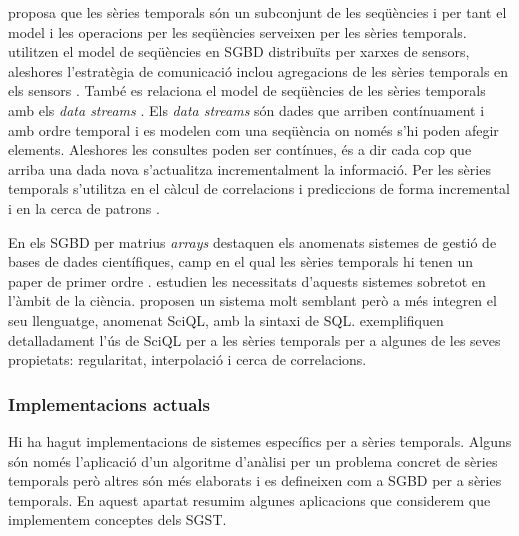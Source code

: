 \textcite{seshadri96:thesis} proposa que les sèries temporals són un subconjunt de les seqüències i per tant el model i les operacions per les seqüències \parencite{seshadri95} serveixen per les sèries temporals. 
\textcite{bonnet01} utilitzen el model de seqüències en SGBD distribuïts per xarxes de sensors, aleshores l'estratègia de comunicació inclou agregacions de les sèries temporals en els sensors \parencite{demers03}.
També es relaciona el model de seqüències de les sèries temporals amb els \emph{data streams} \parencite{babcock02,jagadish95}. Els \emph{data streams} són dades que arriben contínuament i amb ordre temporal i es modelen com una seqüència on només s'hi poden afegir elements. Aleshores les consultes poden ser contínues, és a dir cada cop que arriba una dada nova s'actualitza incrementalment la informació. Per les sèries temporals s'utilitza en el càlcul de correlacions i prediccions de forma incremental \parencite{yi00} i en la cerca de patrons \parencite{bai05}.

En els SGBD per matrius \emph{arrays} destaquen els anomenats sistemes de gestió de bases de dades científiques, camp en el qual les sèries temporals hi tenen un paper de primer ordre \parencite{zhang11}. \textcite{stonebraker09:scidb} estudien les necessitats d'aquests sistemes sobretot en l'àmbit de la ciència. \textcite{kersten11} proposen un sistema molt semblant però a més integren el seu llenguatge, anomenat SciQL, amb la sintaxi de SQL. \textcite{zhang11} exemplifiquen detalladament l'ús de SciQL per a les sèries temporals per a algunes de les seves propietats: regularitat, interpolació i cerca de correlacions.



\subsubsection{Implementacions actuals}

Hi ha hagut implementacions de sistemes específics per a sèries temporals. Alguns són només l'aplicació d'un algoritme d'anàlisi per un problema concret de sèries temporals però  altres  són més elaborats i es defineixen com a SGBD per a sèries temporals. 
En aquest apartat resumim algunes aplicacions que considerem que implementem conceptes dels SGST.



